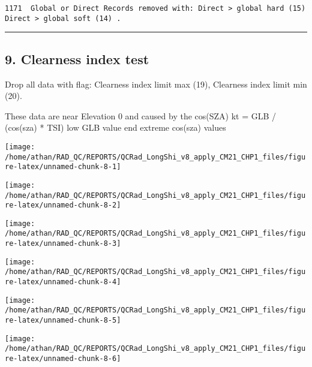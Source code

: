 \documentclass[
  10pt,
  a4paper,oneside]{article}
\begin{document}
\begin{verbatim}
1171  Global or Direct Records removed with: Direct > global hard (15) Direct > global soft (14) .
\end{verbatim}

\begin{center}\rule{0.5\linewidth}{0.5pt}\end{center}

\newpage

\hypertarget{clearness-index-test}{%
\subsection{9. Clearness index test}\label{clearness-index-test}}

Drop all data with flag: Clearness index limit max (19), Clearness index limit min (20).

These data are near Elevation 0 and caused by the cos(SZA)
kt = GLB / (cos(sza) * TSI)
low GLB value end extreme cos(sza) values

\begin{center}\texttt{[image: /home/athan/RAD\_QC/REPORTS/QCRad\_LongShi\_v8\_apply\_CM21\_CHP1\_files/figure-latex/unnamed-chunk-8-1]} \end{center}

\begin{center}\texttt{[image: /home/athan/RAD\_QC/REPORTS/QCRad\_LongShi\_v8\_apply\_CM21\_CHP1\_files/figure-latex/unnamed-chunk-8-2]} \end{center}

\begin{center}\texttt{[image: /home/athan/RAD\_QC/REPORTS/QCRad\_LongShi\_v8\_apply\_CM21\_CHP1\_files/figure-latex/unnamed-chunk-8-3]} \end{center}

\begin{center}\texttt{[image: /home/athan/RAD\_QC/REPORTS/QCRad\_LongShi\_v8\_apply\_CM21\_CHP1\_files/figure-latex/unnamed-chunk-8-4]} \end{center}

\begin{center}\texttt{[image: /home/athan/RAD\_QC/REPORTS/QCRad\_LongShi\_v8\_apply\_CM21\_CHP1\_files/figure-latex/unnamed-chunk-8-5]} \end{center}

\begin{center}\texttt{[image: /home/athan/RAD\_QC/REPORTS/QCRad\_LongShi\_v8\_apply\_CM21\_CHP1\_files/figure-latex/unnamed-chunk-8-6]} \end{center}
\end{document}
